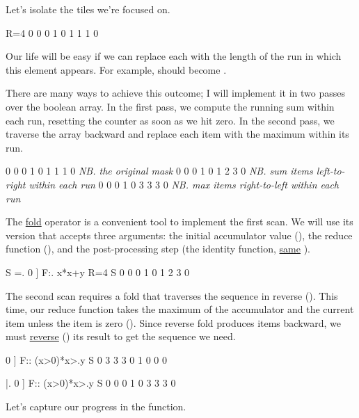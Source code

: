 \documentclass{article}
\begin{document}
Let's isolate the tiles we're focused on.

\begin{code}[j]
   R=4
0 0 0 1 0 1 1 1 0
\end{code}

Our life will be easy if we can replace each  with the length of the run in which this element appears.
For example,  should become .

There are many ways to achieve this outcome; I will implement it in two passes over the boolean array.
In the first pass, we compute the running sum within each run, resetting the counter as soon as we hit zero.
In the second pass, we traverse the array backward and replace each item with the maximum within its run.

\begin{code}
0 0 0 1 0 1 1 1 0  \emph{NB. the original mask}
0 0 0 1 0 1 2 3 0  \emph{NB. sum items left-to-right within each run }
0 0 0 1 0 3 3 3 0  \emph{NB. max items right-to-left within each run }
\end{code}

The \href{https://code.jsoftware.com/wiki/Vocabulary/fcap}{fold} operator is a convenient tool to implement the first scan.
We will use its version that accepts three arguments: the initial accumulator value (), the reduce function (), and the post-processing step (the identity function, \href{https://code.jsoftware.com/wiki/Vocabulary/squarert}{same} \code{\]}).

\begin{code}[j]
   S =. 0 ] F:. {{x*x+y}} R=4
   S
0 0 0 1 0 1 2 3 0
\end{code}

The second scan requires a fold that traverses the sequence in reverse ().
This time, our reduce function takes the maximum of the accumulator and the current item unless the item is zero ().
Since reverse fold produces items backward, we must \href{https://code.jsoftware.com/wiki/Vocabulary/bardot}{reverse} () its result to get the sequence we need.

\begin{code}[j]
   0 ] F:: {{(x>0)*x>.y}} S
0 3 3 3 0 1 0 0 0

   |. 0 ] F:: {{(x>0)*x>.y}} S
0 0 0 1 0 3 3 3 0
\end{code}

Let's capture our progress in the  function.
\end{document}
